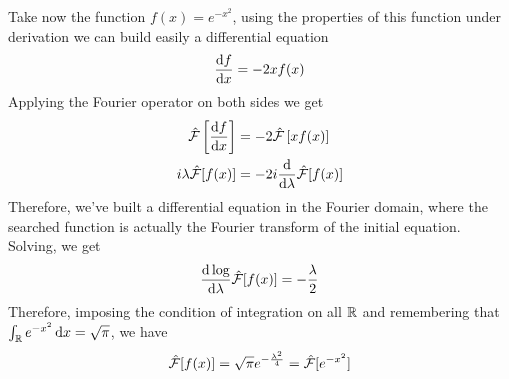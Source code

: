 \documentclass[../complete.tex]{subfiles}
\begin{document}
\begin{eg}
	Take now the function $f(x)=e^{-x^2}$, using the properties of this function under derivation we can build easily a differential equation
	\begin{equation*}
		\derivative{f}{x}=-2xf(x)
	\end{equation*}
	Applying the Fourier operator on both sides we get
	\begin{equation*}
		\begin{aligned}
			\fou\left[ \derivative{f}{x} \right]&=-2\fou\left[ xf(x) \right]\\
			i\lambda\fou[f(x)]&=-2i\derivative{\lambda}\fou[f(x)]
		\end{aligned}
	\end{equation*}
	Therefore, we've built a differential equation in the Fourier domain, where the searched function is actually the Fourier transform of the initial equation. Solving, we get
	\begin{equation*}
		\frac{\mathrm{d}\log}{\mathrm{d}\lambda}\hat{\mathcal{F}}[f(x)]=-\frac{\lambda}{2}
	\end{equation*}
	Therefore, imposing the condition of integration on all $\mathbb{R}$ and remembering that $\int_{\mathbb{R}} e^{-x^2}\operatorname{d\!} x=\sqrt{\pi}$, we have
	\begin{equation*}
		\hat{\mathcal{F}}[f(x)]=\sqrt{\pi}e^{-\frac{\lambda^2}{4}}=\hat{\mathcal{F}}[e^{-x^2}]
	\end{equation*}
\end{eg}
\end{document}
